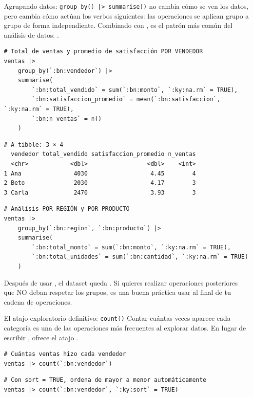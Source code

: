 \documentclass[8pt]{beamer}
\begin{document}
\begin{frame}[fragile]{Agrupando datos: \texttt{group\_by() |> summarise()}}
 no cambia cómo se ven los datos, pero cambia cómo actúan los verbos siguientes: las operaciones se aplican grupo a grupo de forma independiente. Combinado con , es el patrón más común del análisis de datos: .

\begin{lstlisting}[style=RScript]
# Total de ventas y promedio de satisfacción POR VENDEDOR
ventas |>
	group_by(`:bn:vendedor`) |>
	summarise(
		`:bn:total_vendido` = sum(`:bn:monto`, `:ky:na.rm` = TRUE),
		`:bn:satisfaccion_promedio` = mean(`:bn:satisfaccion`, `:ky:na.rm` = TRUE),
		`:bn:n_ventas` = n()
	)
\end{lstlisting}
\begin{lstlisting}[style=RConsole]
# A tibble: 3 × 4
  vendedor total_vendido satisfaccion_promedio n_ventas
  <chr>            <dbl>                 <dbl>    <int>
1 Ana               4030                  4.45        4
2 Beto              2030                  4.17        3
3 Carla             2470                  3.93        3
\end{lstlisting}
\end{frame}



\begin{frame}[fragile]
\begin{lstlisting}[style=RScript]
# Análisis POR REGIÓN y POR PRODUCTO
ventas |>
	group_by(`:bn:region`, `:bn:producto`) |>
	summarise(
		`:bn:total_monto` = sum(`:bn:monto`, `:ky:na.rm` = TRUE),
		`:bn:total_unidades` = sum(`:bn:cantidad`, `:ky:na.rm` = TRUE)
	)
\end{lstlisting}

\begin{block}{}
Después de usar , el dataset queda . Si quieres realizar operaciones posteriores que NO deban respetar los grupos, es una buena práctica usar  al final de tu cadena de operaciones.
\end{block}
\end{frame}



\begin{frame}[fragile]{El atajo exploratorio definitivo: \texttt{count()}}
Contar cuántas veces aparece cada categoría es una de las operaciones más frecuentes al explorar datos. En lugar de escribir ,  ofrece el atajo .

\begin{lstlisting}[style=RScript]
# Cuántas ventas hizo cada vendedor
ventas |> count(`:bn:vendedor`)
\end{lstlisting}

\begin{lstlisting}[style=RScript]
# Con sort = TRUE, ordena de mayor a menor automáticamente
ventas |> count(`:bn:vendedor`, `:ky:sort` = TRUE)
\end{lstlisting}
\end{frame}
\end{document}
